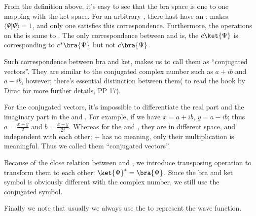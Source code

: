 From the definition above, it's easy to see that the bra space is
one to one mapping with the ket space. For an arbitrary \kett{\Psi},
there hast have an \brat{\Psi}; makes $\langle\Psi|\Psi\rangle = 1$,
and only one \brat{\Psi} satisfies this correspondence. Furthermore,
the operations on the \kett{\Psi} is same to \brat{\Psi}. The only
correspondence between \kett{\Psi} and \brat{\Psi} is, the
$c\ket{\Psi}$ is corresponding to $c^{*}\bra{\Psi}$ but not
$c\bra{\Psi}$.

Such correspondence between bra and ket, makes us to call them as
``conjugated vectors''. They are similar to the conjugated complex
number such as $a+ib$ and $a-ib$, however; there's essential
distinction between them( to read the book by Dirac \cite{Dirac} for
more further details, PP 17).

For the conjugated vectors, it's impossible to differentiate the
real part and the imaginary part in the \kett{\Psi} and \brat{\Psi}.
For example, if we have $x=a+ib$, $y=a-ib$; thus $a= \frac{x+y}{2}$
and $b = \frac{x-y}{2i}$. Whereas for the \kett{\Psi} and
\brat{\Psi}, they are in different space, and independent with each
other; \kett{\Psi} $+$ \brat{\Psi} has no meaning, only their
multiplication is meaningful. Thus we called them ``conjugated
vectors''.

Because of the close relation between \kett{\Psi} and \brat{\Psi},
we introduce transposing operation to transform them to each other:
$\ket{\Psi}^{*} = \bra{\Psi}$. Since the bra and ket symbol is
obviously different with the complex number, we still use the
conjugated symbol.

Finally we note that usually we always use the \kett{\Psi} to
represent the wave function.




